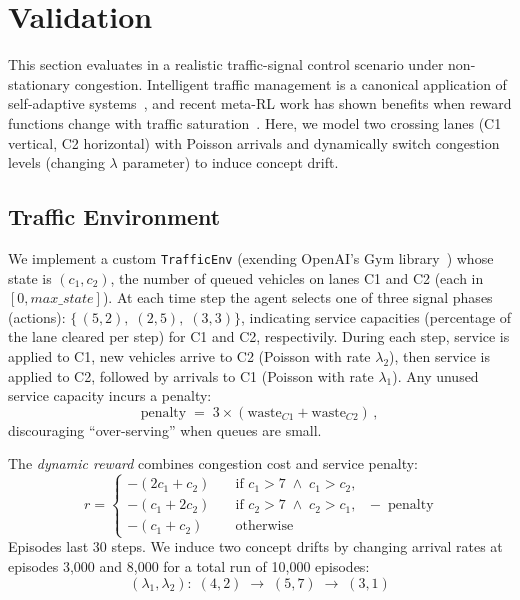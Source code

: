 
\section{Validation}
\label{sec:validation}

This section evaluates \adaptiverl in a realistic traffic-signal control scenario under non-stationary congestion. Intelligent traffic management is a canonical application of self-adaptive systems~\cite{HENRICHS2022106940}, and recent meta-\ac{RL} work has shown benefits when reward functions change with traffic saturation~\cite{meta-rl-traffic}. Here, we model two crossing lanes (C1 vertical, C2 horizontal) with Poisson arrivals and dynamically switch congestion levels (changing $\lambda$ parameter) to induce concept drift.  

\subsection{Traffic Environment}
We implement a custom \texttt{TrafficEnv} (exending OpenAI's Gym library~\cite{towers2024gymnasiumstandardinterfacereinforcement}) whose state is $(c_1,c_2)$, the number of queued vehicles on lanes C1 and C2 (each in $[0,\mathit{max\_state}]$). At each time step the agent selects one of three signal phases (actions): $\{\,(5,2),\;(2,5),\;(3,3)\}$, indicating service capacities (percentage of the lane cleared per step) for C1 and C2, respectivily. During each step, service is applied to C1, new vehicles arrive to C2 (Poisson with rate $\lambda_{2}$), then service is applied to C2, followed by arrivals to C1 (Poisson with rate $\lambda_{1}$). Any unused service capacity incurs a penalty:
\[
\mathrm{penalty} \;=\; 3\times(\text{waste}_{C1} + \text{waste}_{C2})\,,
\]
discouraging “over-serving” when queues are small.

The \emph{dynamic reward} combines congestion cost and service penalty:
\[
r = 
\begin{cases}
-(2c_1 + c_2)\quad &\text{if }c_1>7 \;\wedge\;c_1>c_2,\\
-(c_1 + 2c_2)\quad &\text{if }c_2>7 \;\wedge\;c_2>c_1,\\
-(c_1 + c_2)\quad &\text{otherwise}
\end{cases}
\;-\;\mathrm{penalty}\,
\]
Episodes last 30 steps. We induce two concept drifts by changing arrival rates at episodes 3,000 and 8,000 for a total run of 10,000 episodes:
\[
(\lambda_1,\lambda_2):
\;(4,2)\;\to\;(5,7)\;\to\;(3,1)
\]

